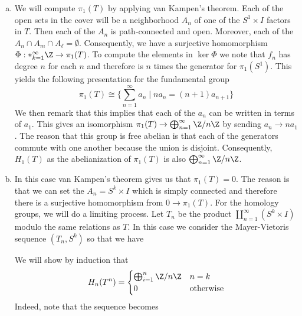 \documentclass{article}
\begin{document}
\begin{solution}{\parindent}
  \begin{enumerate}[(a)]
  \item We will compute $\pi_1(T)$ by applying van Kampen's
    theorem. Each of the open sets in the cover will be a neighborhood
    $A_n$ of one of the $S^1 \times I$ factors in $T$. Then each of
    the $A_n$ is path-connected and open.  Moreover, each of the $A_n
    \cap A_{m} \cap A_\ell = \emptyset$. Consequently, we have a
    surjective homomorphism $\Phi: \ast_{k=1}^\infty \Z \to
    \pi_1(T)$. To compute the elements in $\ker\Phi$ we note that
    $f_n$ has degree $n$ for each $n$ and therefore is $n$ times the
    generator for $\pi_1(S^1)$. This yields the following presentation
    for the fundamental group
    \[
    \pi_1(T) \cong \lbrace \sum_{n=1}^\infty a_n \mid na_n =
    (n+1)a_{n+1}\rbrace
    \]
    We then remark that this implies that each of the $a_n$ can be
    written in terms of $a_1$. This gives an isomorphism $\pi_1(T) \to
    \bigoplus_{n=1}^\infty \Z/n\Z$ by sending $a_n \to na_1$. The
    reason that this group is free abelian is that each of the
    generators commute with one another because the union is
    disjoint. Consequently, $H_1(T)$ as the abelianization of
    $\pi_1(T)$ is also $\bigoplus_{n=1}^\infty \Z/n\Z$.
  \item In this case van Kampen's theorem gives us that $\pi_1(T) =
    0$. The reason is that we can set the $A_n = S^k \times I$ which
    is simply connected and therefore there is a surjective
    homomorphism from $0 \to \pi_1(T)$. For the homology groups, we
    will do a limiting process. Let $T_n$ be the product
    $\coprod_{n=1}^\infty (S^k \times I)$ modulo the same relations as
    $T$. In this case we consider the Mayer-Vietoris sequence
    $(T_n,S^k)$ so that we have
    \begin{center}
    \end{center}
    We will show by induction that
    \[
    H_n(T^n) =
    \begin{cases}
      \bigoplus_{i=1}^n \Z/n\Z & n = k \\
      0 & \text{otherwise}
    \end{cases}
    \]
    Indeed, note that the sequence becomes

\end{enumerate}
\end{solution}
\end{document}
